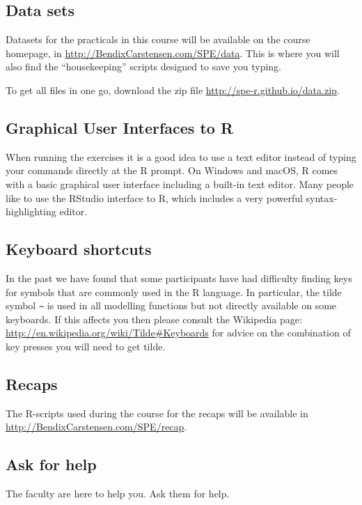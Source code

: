 
\subsection*{Data sets}

Datasets for the practicals in this course will be available on the
course homepage, in \url{http://BendixCarstensen.com/SPE/data}. This
is where you will also find the ``housekeeping'' scripts designed to
save you typing.

To get all files in one go, download the zip
file \url{http://spe-r.github.io/data.zip}.

\subsection*{Graphical User Interfaces to R}

When running the exercises it is a good idea to use a text editor
instead of typing your commands directly at the R prompt. On Windows
and macOS, R comes with a basic graphical user interface including a
built-in text editor. Many people like to use the RStudio interface to
R, which includes a very powerful syntax-highlighting editor.

\subsection*{Keyboard shortcuts}

In the past we have found that some participants have had difficulty
finding keys for symbols that are commonly used in the R language.  In
particular, the tilde symbol \verb+~+ is used in all modelling
functions but not directly available on some keyboards. If this
affects you then please consult the Wikipedia
page: \url{http://en.wikipedia.org/wiki/Tilde#Keyboards} for advice on
the combination of key presses you will need to get tilde.

\subsection*{Recaps}
The R-scripts used during the course for the recaps will be available
in \url{http://BendixCarstensen.com/SPE/recap}.

\subsection*{Ask for help}

The faculty are here to help you. Ask them for help.


